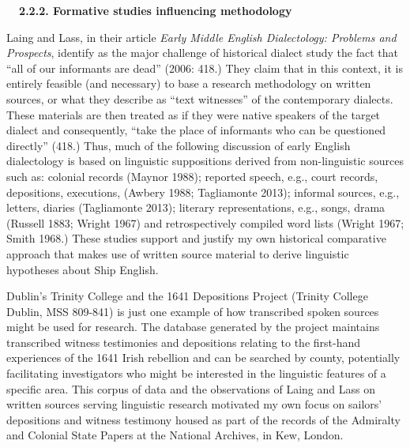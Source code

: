 \begin{styleStandard}
\textbf{\ \ 2.2.2. Formative studies influencing methodology}
\end{styleStandard}

\begin{styleStandard}
Laing and Lass, in their article \textit{Early Middle English Dialectology: Problems and Prospects}, identify as the major challenge of historical dialect study the fact that “all of our informants are dead” (2006: 418.) They claim that in this context, it is entirely feasible (and necessary) to base a research methodology on written sources, or what they describe as “text witnesses” of the contemporary dialects. These materials are then treated as if they were native speakers of the target dialect and consequently, “take the place of informants who can be questioned directly” (418.) Thus, much of the following discussion of early English dialectology is based on linguistic suppositions derived from non-linguistic sources such as: colonial records (Maynor 1988); reported speech, e.g., court records, depositions, executions, (Awbery 1988; Tagliamonte 2013); informal sources, e.g., letters, diaries (Tagliamonte 2013); literary representations, e.g., songs, drama (Russell 1883; Wright 1967) and retrospectively compiled word lists (Wright 1967; Smith 1968.) These studies support and justify my own historical comparative approach that makes use of written source material to derive linguistic hypotheses about Ship English. 
\end{styleStandard}

\begin{styleStandard}
Dublin’s Trinity College and the 1641 Depositions Project (Trinity College Dublin, MSS 809-841) is just one example of how transcribed spoken sources might be used for research. The database generated by the project maintains transcribed witness testimonies and depositions relating to the first-hand experiences of the 1641 Irish rebellion and can be searched by county, potentially facilitating investigators who might be interested in the linguistic features of a specific area. This corpus of data and the observations of Laing and Lass on written sources serving linguistic research motivated my own focus on sailors’ depositions and witness testimony housed as part of the records of the Admiralty and Colonial State Papers at the National Archives, in Kew, London. 
\end{styleStandard}

